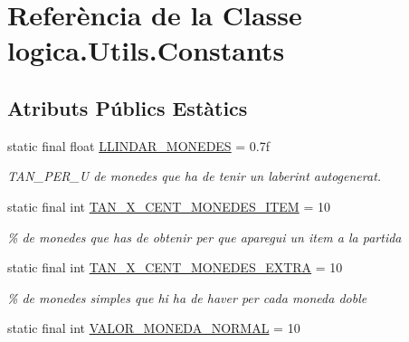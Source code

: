 \hypertarget{classlogica_1_1_utils_1_1_constants}{\section{Referència de la Classe logica.\+Utils.\+Constants}
\label{classlogica_1_1_utils_1_1_constants}
}
\subsection*{Atributs Públics Estàtics}
\begin{DoxyCompactItemize}
\item 
\hypertarget{classlogica_1_1_utils_1_1_constants_a048c8ddd9e3c292ec980d0d5319b0d5e}{static final float \hyperlink{classlogica_1_1_utils_1_1_constants_a048c8ddd9e3c292ec980d0d5319b0d5e}{L\+L\+I\+N\+D\+A\+R\+\_\+\+M\+O\+N\+E\+D\+E\+S} = 0.\+7f}\label{classlogica_1_1_utils_1_1_constants_a048c8ddd9e3c292ec980d0d5319b0d5e}

\begin{DoxyCompactList}\small\item\em T\+A\+N\+\_\+\+P\+E\+R\+\_\+\+U de monedes que ha de tenir un laberint autogenerat. \end{DoxyCompactList}\item 
\hypertarget{classlogica_1_1_utils_1_1_constants_a8e475dac7825a44136e88d67eea69001}{static final int \hyperlink{classlogica_1_1_utils_1_1_constants_a8e475dac7825a44136e88d67eea69001}{T\+A\+N\+\_\+\+X\+\_\+\+C\+E\+N\+T\+\_\+\+M\+O\+N\+E\+D\+E\+S\+\_\+\+I\+T\+E\+M} = 10}\label{classlogica_1_1_utils_1_1_constants_a8e475dac7825a44136e88d67eea69001}

\begin{DoxyCompactList}\small\item\em \% de monedes que has de obtenir per que aparegui un item a la partida \end{DoxyCompactList}\item 
\hypertarget{classlogica_1_1_utils_1_1_constants_a12c59fe7e3530867e1c46c16eda91e0f}{static final int \hyperlink{classlogica_1_1_utils_1_1_constants_a12c59fe7e3530867e1c46c16eda91e0f}{T\+A\+N\+\_\+\+X\+\_\+\+C\+E\+N\+T\+\_\+\+M\+O\+N\+E\+D\+E\+S\+\_\+\+E\+X\+T\+R\+A} = 10}\label{classlogica_1_1_utils_1_1_constants_a12c59fe7e3530867e1c46c16eda91e0f}

\begin{DoxyCompactList}\small\item\em \% de monedes simples que hi ha de haver per cada moneda doble \end{DoxyCompactList}\item 
\hypertarget{classlogica_1_1_utils_1_1_constants_a3067332b704101e903fa39850e86fcf2}{static final int \hyperlink{classlogica_1_1_utils_1_1_constants_a3067332b704101e903fa39850e86fcf2}{V\+A\+L\+O\+R\+\_\+\+M\+O\+N\+E\+D\+A\+\_\+\+N\+O\+R\+M\+A\+L} = 10}\label{classlogica_1_1_utils_1_1_constants_a3067332b704101e903fa39850e86fcf2}


\end{DoxyCompactItemize}
